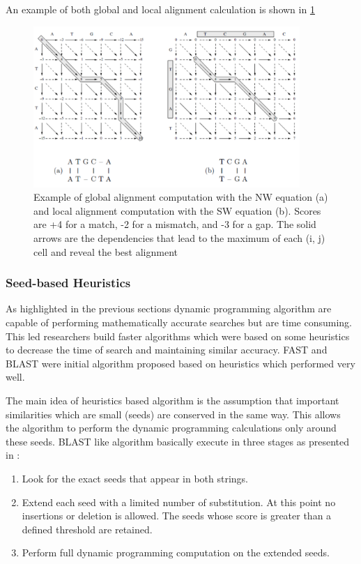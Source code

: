 \documentclass[12pt,twoside]{article}
\begin{document}
An example of both global and local alignment calculation is shown in \cref{fig:alignexample}
\begin{figure}%
    \centering
    \includegraphics[width=0.9\textwidth]{fig/alignexample}
    \caption{Example of global alignment computation with the NW equation (a) and
	local alignment computation with the SW equation (b). Scores are +4 for a match,
	-2 for a mismatch, and -3 for a gap. The solid arrows are the dependencies that
	lead to the maximum of each (i, j) cell and reveal the best alignment \cite[Figure 8.4]{gokhale_reconfigurable_2010}}
    \label{fig:alignexample}
\end{figure}

\subsubsection{Seed-based Heuristics}

As highlighted in the previous sections dynamic programming algorithm are capable of performing mathematically accurate 
searches but are time consuming. This led researchers build faster algorithms which were based on some heuristics
to decrease the time of search and maintaining similar accuracy. FAST \cite{pearson_improved_1988} and BLAST \cite{altschul_basic_1990}
were initial algorithm proposed based on heuristics which performed very well.

The main idea of heuristics based algorithm is the assumption that important similarities which are small (seeds) are conserved in the same
way. This allows the algorithm to perform the dynamic programming calculations only around these seeds. BLAST like algorithm basically
execute in three stages as presented in \cite{gokhale_reconfigurable_2010}:

\begin{enumerate}
	\item Look for the exact seeds that appear in both strings.
	\item Extend each seed with a limited number of substitution. At this point no insertions or deletion is allowed.
		  The seeds whose score is greater than a defined threshold are retained.
	\item Perform full dynamic programming computation on the extended seeds.
\end{enumerate}
\end{document}
